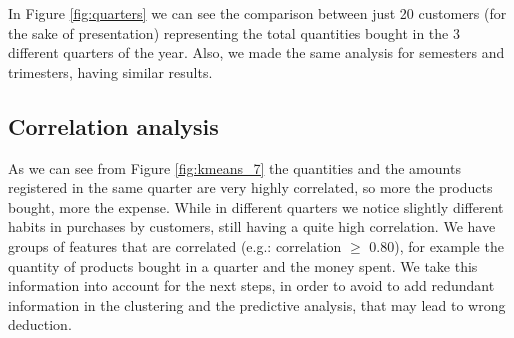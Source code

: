 \documentclass[12pt]{article}
\begin{document}
In Figure \ref{fig:quarters} we can see the comparison between just 20 customers (for the sake of presentation) representing the total quantities bought in the 3 different quarters of the year. Also, we made the same analysis for semesters and trimesters, having similar results.

\subsection{Correlation analysis}
As we can see from Figure \ref{fig:kmeans_7} the quantities and the amounts registered in the same quarter are very highly correlated, so more the products bought, more the expense. While in different quarters we notice slightly different habits in purchases by customers, still having a quite high correlation. We have groups of features that are correlated (e.g.: correlation $\ge$ 0.80), for example the quantity of products bought in a quarter and the money spent. We take this information into account for the next steps, in order to avoid to add redundant information in the clustering and the predictive analysis, that may lead to wrong deduction.
\end{document}
